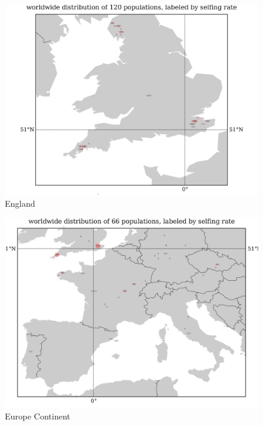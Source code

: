 \documentclass[a4paper,10pt]{article}
\begin{document}
\begin{figure}
\includegraphics[width=1\textwidth]{figures/s0829popid2ecotypeid_5_Eng__7_49_2_55_l3y1_pop_map.png}
\caption{England}\label{f23}
\end{figure}


\begin{figure}
\includegraphics[width=1\textwidth]{figures/s0829popid2ecotypeid_25_EurCont__10_35_20_53_l3y1_pop_map.png}
\caption{Europe Continent}\label{f15}
\end{figure}
\end{document}
